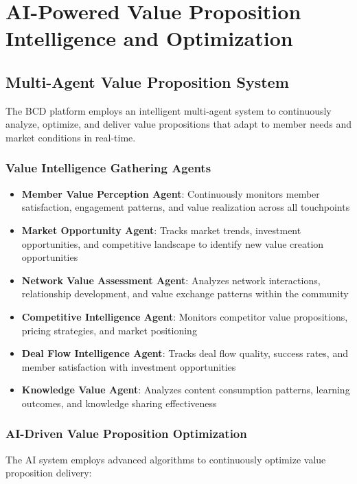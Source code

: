 \section{AI-Powered Value Proposition Intelligence and Optimization}

\subsection{Multi-Agent Value Proposition System}

The BCD platform employs an intelligent multi-agent system to continuously analyze, optimize, and deliver value propositions that adapt to member needs and market conditions in real-time.

\subsubsection{Value Intelligence Gathering Agents}

\begin{itemize}
    \item \textbf{Member Value Perception Agent}: Continuously monitors member satisfaction, engagement patterns, and value realization across all touchpoints
    \item \textbf{Market Opportunity Agent}: Tracks market trends, investment opportunities, and competitive landscape to identify new value creation opportunities
    \item \textbf{Network Value Assessment Agent}: Analyzes network interactions, relationship development, and value exchange patterns within the community
    \item \textbf{Competitive Intelligence Agent}: Monitors competitor value propositions, pricing strategies, and market positioning
    \item \textbf{Deal Flow Intelligence Agent}: Tracks deal flow quality, success rates, and member satisfaction with investment opportunities
    \item \textbf{Knowledge Value Agent}: Analyzes content consumption patterns, learning outcomes, and knowledge sharing effectiveness
\end{itemize}

\subsubsection{AI-Driven Value Proposition Optimization}

The AI system employs advanced algorithms to continuously optimize value proposition delivery:

